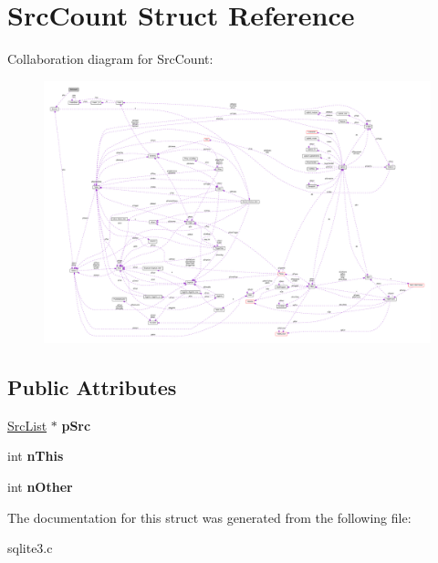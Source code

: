 \hypertarget{structSrcCount}{}\section{Src\+Count Struct Reference}
\label{structSrcCount}


Collaboration diagram for Src\+Count\+:\nopagebreak
\begin{figure}[H]
\begin{center}
\leavevmode
\includegraphics[width=350pt]{structSrcCount__coll__graph}
\end{center}
\end{figure}
\subsection*{Public Attributes}
\begin{DoxyCompactItemize}
\item 
\hyperlink{structSrcList}{Src\+List} $\ast$ {\bfseries p\+Src}\hypertarget{structSrcCount_a7087f00bcaed39cc5032462d7262f4ff}{}\label{structSrcCount_a7087f00bcaed39cc5032462d7262f4ff}

\item 
int {\bfseries n\+This}\hypertarget{structSrcCount_a1aaa40ff75460ebc7778ea63aca14d4d}{}\label{structSrcCount_a1aaa40ff75460ebc7778ea63aca14d4d}

\item 
int {\bfseries n\+Other}\hypertarget{structSrcCount_a5666f8571b2877fdadfe95364ffb5b80}{}\label{structSrcCount_a5666f8571b2877fdadfe95364ffb5b80}

\end{DoxyCompactItemize}


The documentation for this struct was generated from the following file\+:\begin{DoxyCompactItemize}
\item 
sqlite3.\+c\end{DoxyCompactItemize}
